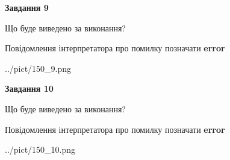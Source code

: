\documentclass[12pt, ukrainian]{article}
\begin{document}
{{\begin {center}\textbf{Завдання 9}\end {center}}\par
Що буде виведено за виконання? \par
Повідомлення інтерпретатора про помилку позначати \textbf{error}

\begin{center}
	{../pict/150_9.png}
\end{center}
\newpage

{\begin {center}\textbf{Завдання 10}\end {center}}\par
Що буде виведено за виконання? \par
Повідомлення інтерпретатора про помилку позначати \textbf{error}

\begin{center}
	{../pict/150_10.png}
\end{center}
\newpage

}
\end{document}
